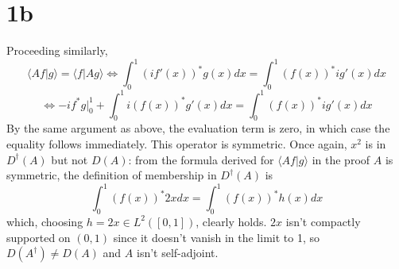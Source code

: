 \documentclass{article}
\begin{document}
\section*{1b}
Proceeding similarly,
\[
  \langle Af|g \rangle=\langle f|Ag \rangle
  \Leftrightarrow \int_{0}^{1}(if'(x))^{*}g(x)dx=\int_{0}^{1}(f(x))^{*}ig'(x)dx
\]
\[
  \Leftrightarrow -if^{*}g\bigg|_{0}^{1}+\int_{0}^{1}i(f(x))^{*}g'(x)dx=\int_{0}^{1}(f(x))^{*}ig'(x)dx
\]
By the same argument as above, the evaluation term is zero, in which case the equality follows immediately.
This operator is symmetric.
Once again, $x^{2}$ is in $D^{\dagger}(A)$ but not $D(A)$: from the formula derived for $\langle Af|g \rangle$ in the proof $A$ is symmetric,
the definition of membership in $D^{\dagger}(A)$ is
\[\int_{0}^{1}(f(x))^{*}2xdx=\int_{0}^{1}(f(x))^{*}h(x)dx\]
which, choosing $h=2x\in L^{2}([0,1])$, clearly holds.
$2x$ isn't compactly supported on $(0,1)$ since it doesn't vanish in the limit to 1, so $D(A^{\dagger})\neq D(A)$ and $A$ isn't self-adjoint.
\end{document}
